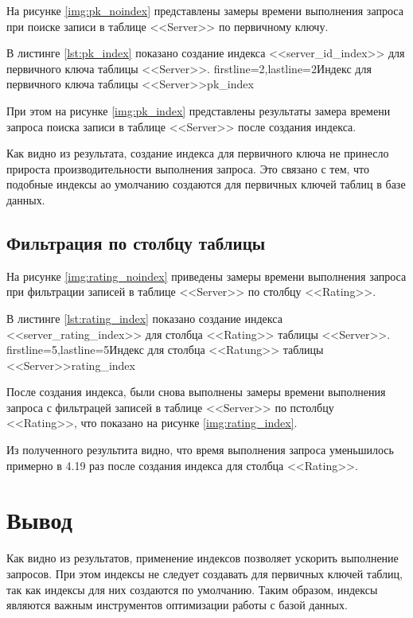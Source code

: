 На рисунке \ref{img:pk_noindex} представлены замеры времени выполнения запроса при поиске записи в таблице <<Server>> по первичному ключу.

В листинге \ref{lst:pk_index} показано создание индекса <<server\_id\_index>> для первичного ключа таблицы <<Server>>. 
            {firstline=2,lastline=2}{Индекс для первичного ключа таблицы <<Server>>}{pk_index}{}

При этом на рисунке \ref{img:pk_index} представлены результаты замера времени запроса поиска записи в таблице <<Server>> после создания индекса.

Как видно из результата, создание индекса для первичного ключа не принесло прироста производительности выполнения запроса. Это связано с тем, что подобные индексы ао умолчанию создаются для первичных ключей таблиц в базе данных.


\subsection{Фильтрация по столбцу таблицы}

На рисунке \ref{img:rating_noindex} приведены замеры времени выполнения запроса при фильтрации записей в таблице <<Server>> по столбцу <<Rating>>.

В листинге \ref{lst:rating_index} показано создание индекса <<server\_rating\_index>> для столбца <<Rating>> таблицы <<Server>>. 
            {firstline=5,lastline=5}{Индекс для столбца <<Ratung>> таблицы <<Server>>}{rating_index}{}

После создания индекса, были снова выполнены замеры времени выполнения запроса с фильтрацей записей в таблице <<Server>> по пстолбцу <<Rating>>, что показано на рисунке \ref{img:rating_index}.

Из полученного результита видно, что время выполнения запроса уменьшилось примерно в 4.19 раз после создания индекса для столбца <<Rating>>.


\section*{Вывод}

Как видно из результатов, применение индексов позволяет ускорить выполнение запросов. При этом индексы не следует создавать для первичных ключей таблиц, так как индексы для них создаются по умолчанию. Таким образом, индексы являются важным инструментов оптимизации работы с базой данных.
